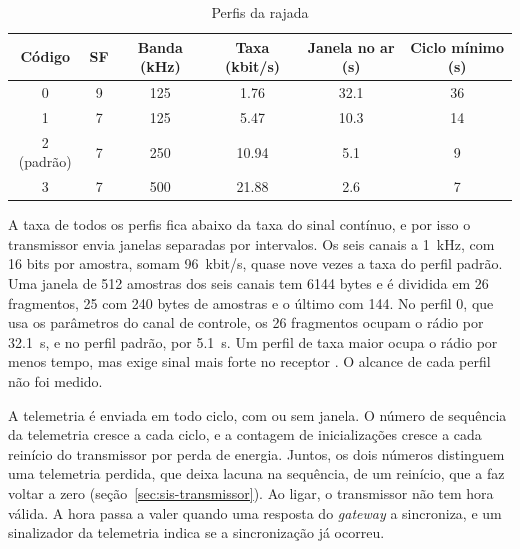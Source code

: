 \begin{table}[!htb]
\centering\small
\caption{Perfis da rajada}\label{tab:sis-perfis}
\begin{tabular}{@{}cccccc@{}}
\toprule
Código & SF & Banda (kHz) & Taxa (kbit/s) & Janela no ar (s) & Ciclo mínimo (s) \\
\midrule
0 & 9 & \num{125} & \num{1,76} & \num{32,1} & \num{36} \\
1 & 7 & \num{125} & \num{5,47} & \num{10,3} & \num{14} \\
2 (padrão) & 7 & \num{250} & \num{10,94} & \num{5,1} & \num{9} \\
3 & 7 & \num{500} & \num{21,88} & \num{2,6} & \num{7} \\
\bottomrule
\end{tabular}
\end{table}

A taxa de todos os perfis fica abaixo da taxa do sinal contínuo, e por isso o transmissor envia janelas separadas por intervalos. Os seis canais a \SI{1}{\kilo\hertz}, com \num{16} bits por amostra, somam \SI{96}{kbit/s}, quase nove vezes a taxa do perfil padrão. Uma janela de \num{512} amostras dos seis canais tem \num{6144} bytes e é dividida em \num{26} fragmentos, \num{25} com \num{240} bytes de amostras e o último com \num{144}. No perfil 0, que usa os parâmetros do canal de controle, os \num{26} fragmentos ocupam o rádio por \SI{32,1}{\second}, e no perfil padrão, por \SI{5,1}{\second}. Um perfil de taxa maior ocupa o rádio por menos tempo, mas exige sinal mais forte no receptor \cite{semtech2015}. O alcance de cada perfil não foi medido.

A telemetria é enviada em todo ciclo, com ou sem janela. O número de sequência da telemetria cresce a cada ciclo, e a contagem de inicializações cresce a cada reinício do transmissor por perda de energia. Juntos, os dois números distinguem uma telemetria perdida, que deixa lacuna na sequência, de um reinício, que a faz voltar a zero (seção~\ref{sec:sis-transmissor}). Ao ligar, o transmissor não tem hora válida. A hora passa a valer quando uma resposta do \textit{gateway} a sincroniza, e um sinalizador da telemetria indica se a sincronização já ocorreu.


